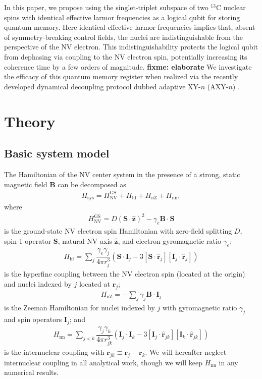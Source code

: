 \documentclass[twocolumn]{revtex4}
\renewcommand{\t}{\text} %
\newcommand{\f}[2]{\dfrac{#1}{#2}} %
\newcommand{\p}[1]{\left(#1\right)} %
\renewcommand{\sp}[1]{\left[#1\right]} %
\renewcommand{\v}{\bm} %
\newcommand{\uv}[1]{\hat{\v{#1}}} %
\renewcommand{\c}{\cdot} %
\newcommand{\fixme}[1]{{\bf \color{red} fixme: #1}}
\begin{document}
In this paper, we propose using the singlet-triplet subspace of two
$^{13}$C nuclear spins with identical effective larmor frequencies as
a logical qubit for storing quantum memory. Here identical effective
larmor frequencies implies that, absent of symmetry-breaking control
fields, the nuclei are indistinguishable from the perspective of the
NV electron. This indistinguishability protects the logical qubit from
dephasing via coupling to the NV electron spin, potentially increasing
its coherence time by a few orders of magnitude. \fixme{elaborate} We
investigate the efficacy of this quantum memory register when realized
via the recently developed dynamical decoupling protocol dubbed
adaptive XY-$n$ (AXY-$n$) \cite{casanova2015robust}.

\section{Theory}

\subsection{Basic system model}

The Hamiltonian of the NV center system in the presence of a strong,
static magnetic field $\v B$ can be decomposed as
\begin{align}
  H_\t{sys} = H_\t{NV}^\t{GS} + H_\t{hf} + H_\t{nZ}  + H_\t{nn},
\end{align}
where
\begin{align}
  H_\t{NV}^\t{GS} = D\p{\v S\c\uv z}^2 - \gamma_e\v B\c\v S
\end{align}
is the ground-state NV electron spin Hamiltonian with zero-field
splitting $D$, spin-1 operator $\v S$, natural NV axis $\uv z$, and
electron gyromagnetic ratio $\gamma_e$;
\begin{align}
  H_\t{hf} = \sum_j\f{\gamma_e\gamma_j}{4\pi r_j^3}
  \p{\v S\c\v I_j-3\sp{\v S\c\uv r_j}\sp{\v I_j\c\uv r_j}}
\end{align}
is the hyperfine coupling between the NV electron spin (located at the
origin) and nuclei indexed by $j$ located at $\v r_j$;
\begin{align}
  H_\t{nZ} = -\sum_j\gamma_j\v B\c\v I_j
\end{align}
is the Zeeman Hamiltonian for nuclei indexed by $j$ with gyromagnetic
ratio $\gamma_j$ and spin operators $\v I_j$; and
\begin{align}
  H_\t{nn} = \sum_{j<k}\f{\gamma_j\gamma_k}{4\pi r_{jk}^3}
  \p{\v I_j\c\v I_k-3\sp{\v I_j\c\uv r_{jk}}\sp{\v I_k\c\uv r_{jk}}}
\end{align}
is the internuclear coupling with $\v r_{jk}\equiv\v r_j-\v r_k$. We
will hereafter neglect internuclear coupling in all analytical work,
though we will keep $H_\t{nn}$ in any numerical results.
\end{document}

